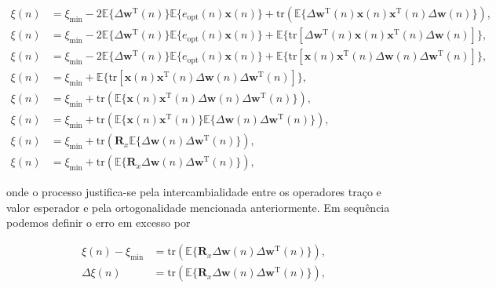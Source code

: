 \begin{enumerate}
        \begin{align}
            \xi(n) &= \xi_{\text{min}} - 2 \mathbb{E}\{\Delta \mathbf{w}^{\text{T}}(n)\} \mathbb{E}\{e_{\text{opt}}(n) \mathbf{x}(n)\} + \text{tr}(\mathbb{E}\{\Delta \mathbf{w}^{\text{T}}(n) \mathbf{x}(n) \mathbf{x}^{\text{T}}(n) \Delta \mathbf{w}(n)\}), \\
            \xi(n) &= \xi_{\text{min}} - 2 \mathbb{E}\{\Delta \mathbf{w}^{\text{T}}(n)\} \mathbb{E}\{e_{\text{opt}}(n)\mathbf{x}(n)\} + \mathbb{E}\{\text{tr}[\Delta \mathbf{w}^{\text{T}}(n) \mathbf{x}(n) \mathbf{x}^{\text{T}}(n) \Delta \mathbf{w}(n)]\}, \\
            \xi(n) &= \xi_{\text{min}} - 2 \mathbb{E}\{\Delta \mathbf{w}^{\text{T}}(n)\} \mathbb{E}\{e_{\text{opt}}(n)\mathbf{x}(n)\} + \mathbb{E}\{\text{tr}[\mathbf{x}(n) \mathbf{x}^{\text{T}}(n) \Delta \mathbf{w}(n) \Delta \mathbf{w}^{\text{T}}(n)]\}, \\
            \xi(n) &= \xi_{\text{min}} + \mathbb{E}\{\text{tr}[\mathbf{x}(n) \mathbf{x}^{\text{T}}(n) \Delta \mathbf{w}(n) \Delta \mathbf{w}^{\text{T}}(n)]\}, \\
            \xi(n) &= \xi_{\text{min}} + \text{tr}(\mathbb{E}\{\mathbf{x}(n) \mathbf{x}^{\text{T}}(n) \Delta \mathbf{w}(n) \Delta \mathbf{w}^{\text{T}}(n)\}), \\
            \xi(n) &= \xi_{\text{min}} + \text{tr}(\mathbb{E}\{\mathbf{x}(n) \mathbf{x}^{\text{T}}(n)\} \mathbb{E}\{\Delta \mathbf{w}(n) \Delta \mathbf{w}^{\text{T}}(n)\}), \\
            \xi(n) &= \xi_{\text{min}} + \text{tr}(\mathbf{R}_{x} \mathbb{E}\{\Delta \mathbf{w}(n) \Delta \mathbf{w}^{\text{T}}(n)\}), \\
            \xi(n) &= \xi_{\text{min}} + \text{tr}(\mathbb{E}\{\mathbf{R}_{x} \Delta \mathbf{w}(n) \Delta \mathbf{w}^{\text{T}}(n)\}), 
        \end{align}

        onde o processo justifica-se pela intercambialidade entre os operadores traço e valor esperador e pela ortogonalidade mencionada anteriormente. Em sequência podemos definir o erro em excesso por

        \begin{align}
            \xi(n) - \xi_{\text{min}} &= \text{tr}(\mathbb{E}\{\mathbf{R}_{x} \Delta \mathbf{w}(n) \Delta \mathbf{w}^{\text{T}}(n)\}), \\
            \Delta \xi(n) &= \text{tr}(\mathbb{E}\{\mathbf{R}_{x} \Delta \mathbf{w}(n) \Delta \mathbf{w}^{\text{T}}(n)\}), \label{excesso1}
        \end{align}


\end{enumerate}
